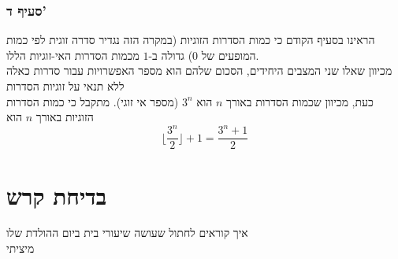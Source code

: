 \documentclass[12pt, titlepage]{article}
\begin{document}
\section*{סעיף ד'}
הראינו בסעיף הקודם כי כמות הסדרות הזוגיות (במקרה הזה נגדיר סדרה זוגית לפי כמות המופעים של $0$) גדולה ב-$1$ מכמות הסדרות האי-זוגיות הללו.\\
מכיוון שאלו שני המצבים היחידים, הסכום שלהם הוא מספר האפשרויות עבור סדרות כאלה ללא תנאי על זוגיות הסדרות\\
כעת, מכיוון שכמות הסדרות באורך $n$ הוא $3^n$ (מספר אי זוגי). מתקבל כי כמות הסדרות הזוגיות באורך $n$ הוא
\[
    \boxed{  \lfloor \frac{3^n}{2}\rfloor+1 = \frac{3^n+1}{2}}
\]
\newpage
\part*{בדיחת קרש}
איך קוראים לחתול שעושה שיעורי בית ביום ההולדת שלו\\
מיציתי
\end{document}
